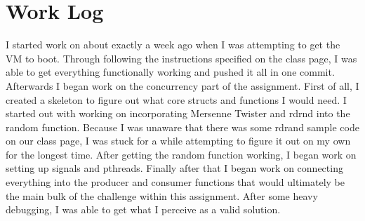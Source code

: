 \documentclass[letterpaper,10pt,titlepage]{article}
\begin{document}
\section{Work Log}

I started work on about exactly a week ago when I was attempting to get the VM to boot.  Through following the instructions specified on the class page, I was able to get everything functionally working and pushed it all in one commit.  Afterwards I began work on the concurrency part of the assignment.  First of all, I created a skeleton to figure out what core structs and functions I would need.  I started out with working on incorporating Mersenne Twister and rdrnd into the random function.  Because I was unaware that there was some rdrand sample code on our class page, I was stuck for a while attempting to figure it out on my own for the longest time.  After getting the random function working, I began work on setting up signals and pthreads.  Finally after that I began work on connecting everything into the producer and consumer functions that would ultimately be the main bulk of the challenge within this assignment.  After some heavy debugging, I was able to get what I perceive as a valid solution.
\end{document}
